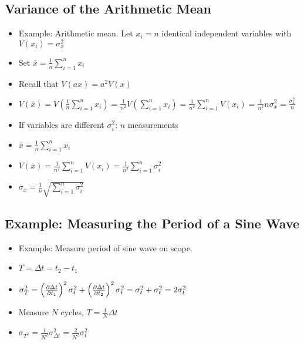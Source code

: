 \subsection{Variance of the Arithmetic Mean}

\begin{itemize}
    \item Example: Arithmetic mean. Let $x_i = n$ identical independent variables with $V(x_i) = \sigma_x^2$
    \item Set $\bar{x} = \frac{1}{n} \sum_{i=1}^{n} x_i$
    \item Recall that $V(a x) = a^2 V(x)$
    \item $V(\bar{x}) = V\left(\frac{1}{n} \sum_{i=1}^{n} x_i\right) = \frac{1}{n^2} V\left(\sum_{i=1}^{n} x_i\right) = \frac{1}{n^2} \sum_{i=1}^{n} V(x_i) = \frac{1}{n^2} n \sigma_x^2 = \frac{\sigma_x^2}{n}$
    \item If variables are different $\sigma_i^2$: $n$ measurements
    \item $\bar{x} = \frac{1}{n} \sum_{i=1}^{n} x_i$
    \item $V(\bar{x}) = \frac{1}{n^2} \sum_{i=1}^{n} V(x_i) = \frac{1}{n^2} \sum_{i=1}^{n} \sigma_i^2$
    \item $\sigma_{\bar{x}} = \frac{1}{n} \sqrt{\sum_{i=1}^{n} \sigma_i^2}$
\end{itemize}

\subsection{Example: Measuring the Period of a Sine Wave}

\begin{itemize}
    \item Example: Measure period of sine wave on scope.
    \item $T = \Delta t = t_2 - t_1$
    \item $\sigma_T^2 = \left(\pdv{\Delta t}{t_1} \right)^2 \sigma_{t}^2 + \left(\pdv{\Delta t}{t_2} \right)^2 \sigma_{t}^2 = \sigma_t^2 + \sigma_t^2 = 2 \sigma_t^2$
    \item Measure $N$ cycles, $T = \frac{1}{N} \Delta t $
    \item $ \sigma_{T^2} = \frac{1}{N^2} \sigma_{\Delta t}^2 = \frac{2}{N^2} \sigma_t^2$
\end{itemize}
